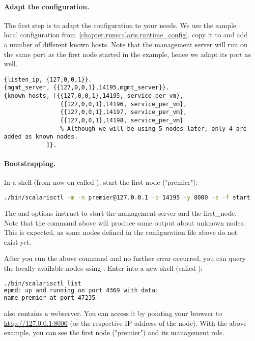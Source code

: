 \paragraph{Adapt the configuration.}
The first step is to adapt the configuration to your needs. We use the
sample local configuration from~\ref{chapter.runscalaris.runtime_config},
copy it to  and add a number of different known
hosts. Note that the management server will run on the same port as the
first node started in the example, hence we adapt its port as well.

\begin{lstlisting}
{listen_ip, {127,0,0,1}}.
{mgmt_server, {{127,0,0,1},14195,mgmt_server}}.
{known_hosts, [{{127,0,0,1},14195, service_per_vm},
                {{127,0,0,1},14196, service_per_vm},
                {{127,0,0,1},14197, service_per_vm},
                {{127,0,0,1},14198, service_per_vm}
                % Although we will be using 5 nodes later, only 4 are added as known nodes.
            ]}.
\end{lstlisting}

\paragraph{Bootstrapping.}
\label{par:Bootstrapping}

In a shell (from now on called ), start the first node ("premier"):
\begin{lstlisting}[language=sh]
./bin/scalarisctl -m -n premier@127.0.0.1 -p 14195 -y 8000 -s -f start
\end{lstlisting}
The  and  options instruct  to start the
management server and the first\_node. Note that the command above will
produce some output about unknown nodes. This is expected, as some nodes
defined in the configuration file above do not exist yet.

After you run the above command and no further error occurred, you can query
the locally available nodes using . Enter into a new shell
(called ):
\begin{lstlisting}[language=sh]
./bin/scalarisctl list
epmd: up and running on port 4369 with data:
name premier at port 47235
\end{lstlisting}

\scalaris{} also contains a webserver. You can access it by pointing your
browser to \url{http://127.0.0.1:8000} (or the respective IP address of the
node). With the above example, you can see the first node ("premier") and
its management role.

